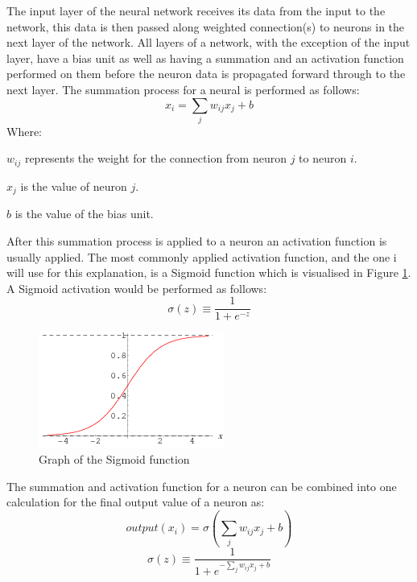 \documentclass[10pt]{article}
\begin{document}
		The input layer of the neural network receives its data from the input to the network, this data is then passed along weighted connection(s) to neurons in the next layer of the network. All layers of a network, with the exception of the input layer, have a bias unit as well as having a summation and an activation function performed on them before the neuron data is propagated forward through to the next layer. The summation process for a neural is performed as follows:
		\begin{equation}
			x_i = \sum_{j} w_{ij} x_j + b 
		\end{equation}
		Where:
		\begin{list}{•}{•}
			\item $w_{ij}$ represents the weight for the connection from neuron $j$ to neuron $i$.
			\item $x_j$ is the value of neuron $j$.
			\item $b$ is the value of the bias unit.
		\end{list}
		
		After this summation process is applied to a neuron an activation function is usually applied. The most commonly applied activation function, and the one i will use for this explanation, is a Sigmoid function which is visualised in Figure \ref{sigmoid}. A Sigmoid activation would be performed as follows:\\
		\begin{equation}
			\sigma(z) \equiv \frac{1}{1+e^{-z}}
		\end{equation}
		
		\begin{figure}[h]			
			\includegraphics[scale=0.75]{img/sigmoid}
			\centering
			\caption{Graph of the Sigmoid function \cite{sigGraph}}
			\label{sigmoid}
		\end{figure}
		
		The summation and activation function for a neuron can be combined into one calculation for the final output value of a neuron as:\\
		\begin{equation}
			output(x_i) = \sigma (\sum_j w_{ij} x_{j} + b)
		\end{equation}	
		\begin{equation}
			\sigma(z) \equiv \frac{1}{1+e^{-\sum_j w_{ij} x_{j} + b}}
		\end{equation}
		
\end{document}
